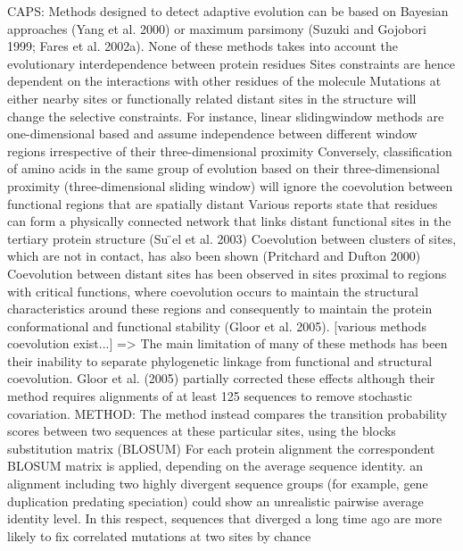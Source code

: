 CAPS: Methods designed to detect adaptive evolution can be based on Bayesian approaches (Yang et al. 2000) or maximum parsimony (Suzuki and Gojobori 1999; Fares et al. 2002a). None of these methods takes into account the evolutionary interdependence between protein residues \cite{fares2006novel}
Sites constraints are hence dependent on the interactions with other residues of the molecule \cite{fares2006novel}
Mutations at either nearby sites or functionally related distant sites in the structure will change the selective constraints. \cite{fares2006novel}
For instance, linear slidingwindow methods are one-dimensional based and assume independence between different window regions irrespective of their three-dimensional proximity \cite{fares2006novel}
Conversely, classification of amino acids in the same group of evolution based on their three-dimensional proximity (three-dimensional sliding window) will ignore the coevolution between functional regions that are spatially distant
Various reports state that residues can form a physically connected network that links distant functional sites in the tertiary protein structure (Su ̈el et al. 2003) \cite{fares2006novel}
Coevolution between clusters of sites, which are not in contact, has also been shown (Pritchard and Dufton 2000) \cite{fares2006novel}
Coevolution between distant sites has been observed in sites proximal to regions with critical functions, where coevolution occurs to maintain the structural characteristics around these regions and consequently to maintain the protein conformational and functional stability (Gloor et al. 2005). \cite{fares2006novel}
[various methods coevolution exist...] => The main limitation of many of these methods has been their inability to separate phylogenetic linkage from functional and structural coevolution.  \cite{fares2006novel}
Gloor et al. (2005) partially corrected these effects although their method requires alignments of at least 125 sequences to remove stochastic covariation. \cite{fares2006novel}
	METHOD: \cite{fares2006novel}
		The method instead compares the transition probability scores between two sequences at these particular sites, using the blocks substitution matrix (BLOSUM) \cite{fares2006novel}
		For each protein alignment the correspondent BLOSUM matrix is applied, depending on the average sequence identity. \cite{fares2006novel}
		an alignment including two highly divergent sequence groups (for example, gene duplication predating speciation) could show an unrealistic pairwise average identity level. In this respect, sequences that diverged a long time ago are more likely to fix correlated mutations at two sites by chance \cite{fares2006novel}
